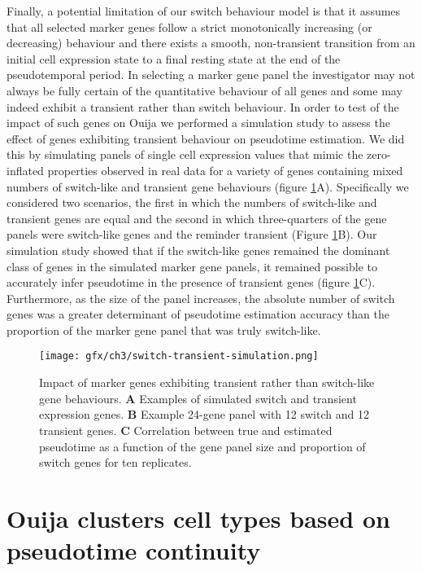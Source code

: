 Finally, a potential limitation of our switch behaviour model is that it assumes that all selected marker genes follow a strict monotonically increasing (or decreasing) behaviour and there exists a smooth, non-transient transition from an initial cell expression state to a final resting state at the end of the pseudotemporal period. In selecting a marker gene panel the investigator may not always be fully certain of the quantitative behaviour of all genes and some may indeed exhibit a transient rather than switch behaviour. In order to test of the impact of such genes on Ouija we performed a simulation study to assess the effect of genes exhibiting transient behaviour on pseudotime estimation. We did this by simulating panels of single cell expression values that mimic the zero-inflated properties observed in real data for a variety of genes containing mixed numbers of switch-like and transient gene behaviours (figure \ref{fig:switch-transient-simulation}A). Specifically we considered two scenarios, the first in which the numbers of switch-like and transient genes are equal and the second in which three-quarters of the gene panels were switch-like genes and the reminder transient (Figure \ref{fig:switch-transient-simulation}B). Our simulation study showed that if the switch-like genes remained the dominant class of genes in the simulated marker gene panels, it remained possible to accurately infer pseudotime in the presence of transient genes (figure \ref{fig:switch-transient-simulation}C). Furthermore, as the size of the panel increases, the absolute number of switch genes was a greater determinant of pseudotime estimation accuracy than the proportion of the marker gene panel that was truly switch-like.

\begin{figure}
	\texttt{[image: gfx/ch3/switch-transient-simulation.png]}
	\caption[Impact of marker genes exhibiting transient rather than switch-like gene behaviours.]{Impact of marker genes exhibiting transient rather than switch-like gene behaviours. \textbf{A} Examples of simulated switch and transient expression genes. \textbf{B} Example 24-gene panel with 12 switch and 12 transient genes. \textbf{C} Correlation between true and estimated pseudotime as a function of the gene panel size and proportion of switch genes for ten replicates.}
	\label{fig:switch-transient-simulation}
\end{figure}


\section{Ouija clusters cell types based on pseudotime continuity}

